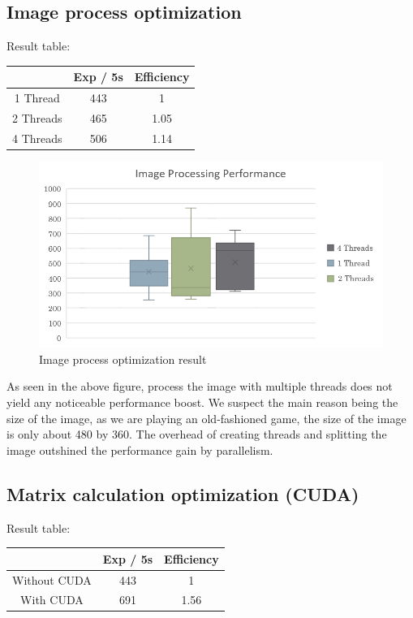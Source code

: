 \documentclass[sigconf]{acmart}
\begin{document}
\subsection{Image process optimization}
Result table:
\begin{center}
  \begin{tabular}{ |c|c|c| } 
   \hline
    & Exp / 5s & Efficiency \\ 
   \hline
   1 Thread & 443 & 1 \\ 
   \hline
   2 Threads & 465 & 1.05 \\ 
   \hline
   4 Threads & 506 & 1.14 \\ 
   \hline
  \end{tabular}
\end{center}

\begin{figure}[h]
  \centering
  \includegraphics[width=\columnwidth]{img_r.png}
  \caption{Image process optimization result}
\end{figure}
As seen in the above figure, process the image with multiple threads does not yield any noticeable performance boost. We suspect the main reason being the size of the image, as we are playing an old-fashioned game, the size of the image is only about 480 by 360. The overhead of creating threads and splitting the image outshined the performance gain by parallelism.

\subsection{Matrix calculation optimization (CUDA)}
Result table:
\begin{center}
  \begin{tabular}{ |c|c|c| } 
   \hline
    & Exp / 5s & Efficiency \\ 
   \hline
   Without CUDA & 443 & 1 \\ 
   \hline
   With CUDA & 691 & 1.56 \\ 
   \hline
  \end{tabular}
\end{center}
\end{document}
